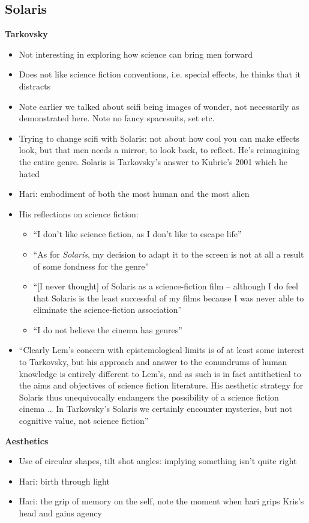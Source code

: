 \documentclass[11pt,fleqn]{book}
\begin{document}
\subsection{Solaris}
\textbf{Tarkovsky}
\begin{itemize}
    \item Not interesting in exploring how science can bring men forward
    \item Does not like science fiction conventions, i.e. special effects, he thinks that it distracts
    \item Note earlier we talked about scifi being images of wonder, not necessarily as demonstrated here. Note no fancy spacesuits, set etc.
    \item Trying to change scifi with Solaris: not about how cool you can make effects look, but that men needs a mirror, to look back, to reflect. He's reimagining the entire genre. Solaris is Tarkovsky's answer to Kubric's 2001 which he hated
    \item Hari: embodiment of both the most human and the most alien
    \item His reflections on science fiction:
    \begin{itemize}
        \item \enquote{I don't like science fiction, as I don't like to escape life}
        \item \enquote{As for \textit{Solaris}, my decision to adapt it to the screen is not at all a result of
some fondness for the genre}
        \item \enquote{[I never thought] of Solaris as a science-fiction film – although I do feel that
Solaris is the least successful of my films because I was never able to
eliminate the science-fiction association}
        \item \enquote{I do not believe the cinema has genres}
    \end{itemize}
    \item \enquote{Clearly Lem's concern with epistemological limits is of at least some
interest to Tarkovsky, but his approach and answer to the conundrums
of human knowledge is entirely different to Lem's, and as such is in fact
antithetical to the aims and objectives of science fiction literature. His
aesthetic strategy for Solaris thus unequivocally endangers the
possibility of a science fiction cinema … In Tarkovsky's Solaris we
certainly encounter mysteries, but not cognitive value, not science
fiction}
\end{itemize}
\textbf{Aesthetics}
\begin{itemize}
    \item Use of circular shapes, tilt shot angles: implying something isn't quite right
    \item Hari: birth through light
    \item Hari: the grip of memory on the self, note the moment when hari grips Kris's head and gains agency
\end{itemize}
\end{document}
